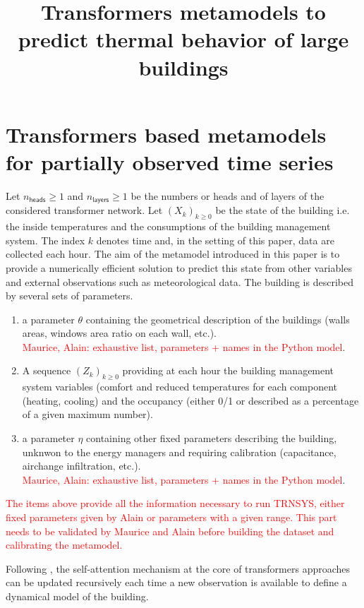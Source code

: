\documentclass[nolayout]{article}
\title{Transformers metamodels to predict thermal behavior of large buildings}
\date{}
\def\nhead{n_{\mathsf{heads}}}
\def\nlayer{n_{\mathsf{layers}}}
\begin{document}
\maketitle

\section{Transformers based metamodels for partially observed time series}
\label{sec:smctransformers}
Let $\nhead\geqslant 1$ and $\nlayer\geqslant 1$ be the numbers or heads and of layers of the considered transformer network. Let $(X_k)_{k\geqslant 0}$ be the state of the building i.e. the inside temperatures and the consumptions of the building management system. The index $k$ denotes time and, in the setting of this paper, data are collected each hour. The aim of the metamodel introduced in this paper is to provide a numerically efficient solution to predict this state from other variables and external observations such as meteorological data. The building is described by several sets of parameters.
\begin{enumerate}[-]
\item a parameter $\theta$ containing the geometrical description of the buildings (walls areas, windows area ratio on each wall, etc.). \\
\textcolor{red}{Maurice, Alain: exhaustive list, parameters + names in the Python model}.
\item A sequence $(Z_k)_{k\geqslant 0}$ providing at each hour the building management system variables (comfort and reduced temperatures for each component (heating, cooling) and the occupancy (either 0/1 or described as a percentage of a given maximum number).
\item a parameter $\eta$ containing other fixed parameters describing the building, unknwon to the energy managers and requiring calibration (capacitance, airchange infiltration, etc.). \\
\textcolor{red}{Maurice, Alain: exhaustive list, parameters + names in the Python model}.
\end{enumerate}
\textcolor{red}{The items above provide all the information necessary to run TRNSYS, either fixed parameters given by Alain or parameters with a given range. This part needs to be validated by Maurice and Alain before building the dataset and calibrating the metamodel.}

Following \cite{}, the self-attention mechanism at the core of transformers approaches can be updated recursively each time a new observation is available to define a dynamical model of the building. 
\end{document}

